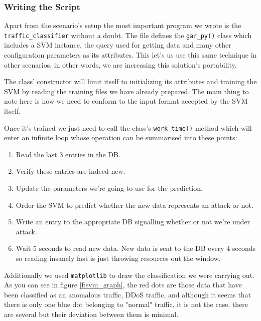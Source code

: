 \documentclass[12pt]{article}
\newcommand{\newpar} {
    \vskip 1cm
}
\begin{document}
		\subsubsection{Writing the Script}
			Apart from the scenario's setup the most important program we wrote is the \texttt{traffic\_classifier} without a doubt. The file defines the \texttt{gar\_py()} class which includes a SVM instance, the query used for getting data and many other configuration parameters as its attributes. This let's us use this same technique in other scenarios, in other words, we are increasing this solution's portability.
			\newpar
			The class' constructor will limit itself to initializing its attributes and training the SVM by reading the training files we have already prepared. The main thing to note here is how we need to conform to the input format accepted by the SVM itself.
			\newpar
			Once it's trained we just need to call the class's \texttt{work\_time()} method which will enter an infinite loop whose operation can be summarised into these points:

			\begin{enumerate}
				\item Read the last 3 entries in the DB.
				\item Verify these entries are indeed new.
				\item Update the parameters we're going to use for the prediction.
				\item Order the SVM to predict whether the new data represents an attack or not.
				\item Write an entry to the appropriate DB signalling whether or not we're under attack.
				\item Wait 5 seconds to read new data. New data is sent to the DB every 4 seconds so reading insanely fast is just throwing resources out the window.
			\end{enumerate}

			Additionally we used \texttt{matplotlib} to draw the classification we were carrying out. As you can see in figure \ref{f:svm_graph}, the red dots are those data that have been classified as an anomalous traffic, DDoS traffic, and although it seems that there is only one blue dot belonging to "normal" traffic, it is not the case, there are several but their deviation between them is minimal.
\end{document}
